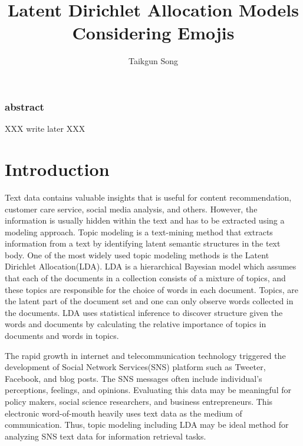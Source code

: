 \documentclass[]{article}
\title{Latent Dirichlet Allocation Models Considering Emojis}
\author{Taikgun Song}
\date{}
\begin{document}
\maketitle

\newcommand{\hh}[1]{{\color{orange} #1}}
\newcommand{\ts}[1]{\textcolor{blue}{#1}}





\subsubsection{abstract}\label{abstract}

XXX write later XXX

\tableofcontents

\section{Introduction}\label{introduction}

Text data contains valuable insights that is useful for content
recommendation, customer care service, social media analysis, and
others. However, the information is usually hidden within the text and
has to be extracted using a modeling approach. Topic modeling is a
text-mining method that extracts information from a text by identifying
latent semantic structures in the text body. One of the most widely used
topic modeling methods is the Latent Dirichlet Allocation(LDA). LDA is a
hierarchical Bayesian model which assumes that each of the documents in
a collection consists of a mixture of topics, and these topics are
responsible for the choice of words in each document. Topics, are the
latent part of the document set and one can only observe words collected
in the documents. LDA uses statistical inference to discover structure
given the words and documents by calculating the relative importance of
topics in documents and words in topics.

The rapid growth in internet and telecommunication technology triggered
the development of Social Network Services(SNS) platform such as
Tweeter, Facebook, and blog posts. The SNS messages often include
individual's perceptions, feelings, and opinions. Evaluating this data
may be meaningful for policy makers, social science researchers, and
business entrepreneurs. This electronic word-of-mouth heavily uses text
data as the medium of communication. Thus, topic modeling including LDA
may be ideal method for analyzing SNS text data for information
retrieval tasks.
\end{document}
